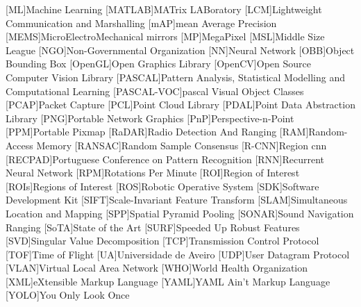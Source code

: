 \begin{multicols}{2}
\begin{acronym}[AAAAAA]
	[ML]{Machine Learning}
	[MATLAB\textsuperscript{\tiny\textregistered}]{MATrix LABoratory\textsuperscript{\tiny\textregistered}}
	[LCM]{Lightweight Communication and Marshalling}
	[mAP]{mean Average Precision}
	[MEMS]{MicroElectroMechanical mirrors}
	[MP]{MegaPixel}
	[MSL]{Middle Size League}
	[NGO]{Non-Governmental Organization} 
	[NN]{Neural Network}
	[OBB]{Object Bounding Box}
	[OpenGL]{Open Graphics Library}
	[OpenCV]{Open Source Computer Vision Library}
	[PASCAL]{Pattern Analysis, Statistical Modelling and Computational Learning} 
	[PASCAL-VOC]{\acl{pascal} Visual Object Classes}
	[PCAP]{Packet Capture}
	[PCL]{Point Cloud Library}
	[PDAL]{Point Data Abstraction Library}
	[PNG]{Portable Network Graphics}
	[PnP]{Perspective-n-Point}
	[PPM]{Portable Pixmap}
	[RaDAR]{Radio Detection And Ranging}
	[RAM]{Random-Access Memory}
	[RANSAC]{Random Sample Consensus}
	[R-CNN]{Region \acl{cnn}}
	[RECPAD]{Portuguese Conference on Pattern Recognition}
	[RNN]{Recurrent Neural Network}
	[RPM]{Rotations Per Minute}
	[ROI]{Region of Interest}
	[ROIs]{Regions of Interest}
	[ROS]{Robotic Operative System}
	[SDK]{Software Development Kit}
	[SIFT]{Scale-Invariant Feature Transform}
	[SLAM]{Simultaneous Location and Mapping} 
	[SPP]{Spatial Pyramid Pooling}
	[SONAR]{Sound Navigation Ranging}
	[SoTA]{State of the Art}
	[SURF]{Speeded Up Robust Features}
	[SVD]{Singular Value Decomposition}
	[TCP]{Transmission Control Protocol}
	[TOF]{Time of Flight} 
	[UA]{Universidade de Aveiro}
	[UDP]{User Datagram Protocol}
	[VLAN]{Virtual Local Area Network}
	[WHO]{World Health Organization}
	[XML]{eXtensible Markup Language}
	[YAML]{YAML Ain't Markup Language}
	[YOLO]{You Only Look Once}
\end{acronym}
\end{multicols}

